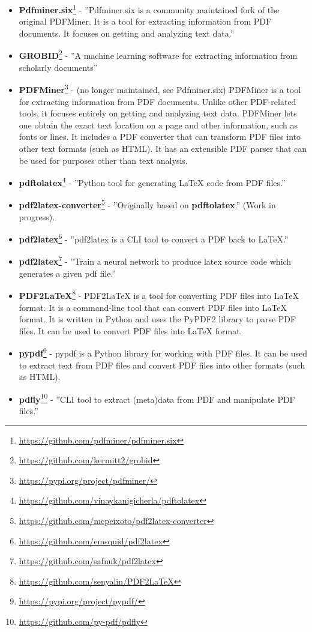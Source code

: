 \begin{itemize}
    \item \textbf{Pdfminer.six}\footnote{\url{https://github.com/pdfminer/pdfminer.six}} - ''Pdfminer.six is a community maintained fork of the original PDFMiner. It is a tool for extracting information from PDF documents. It focuses on getting and analyzing text data.''
    \item \textbf{GROBID}\footnote{\url{https://github.com/kermitt2/grobid}} - ''A machine learning software for extracting information from scholarly documents''
    \item \textbf{PDFMiner}\footnote{\url{https://pypi.org/project/pdfminer/}} - (no longer maintained, see Pdfminer.six) PDFMiner is a tool for extracting information from PDF documents. Unlike other PDF-related tools, it focuses entirely on getting and analyzing text data. PDFMiner lets one obtain the exact text location on a page and other information, such as fonts or lines. It includes a PDF converter that can transform PDF files into other text formats (such as HTML). It has an extensible PDF parser that can be used for purposes other than text analysis.
    \item \textbf{pdftolatex}\footnote{\url{https://github.com/vinaykanigicherla/pdftolatex}} - ''Python tool for generating \LaTeX{} code from PDF files.''
    \item \textbf{pdf2latex-converter}\footnote{\url{https://github.com/mcpeixoto/pdf2latex-converter}} - ''Originally based on \textbf{pdftolatex}.'' (Work in progress).
    \item \textbf{pdf2latex}\footnote{\url{https://github.com/emsquid/pdf2latex}} - ''pdf2latex is a CLI tool to convert a PDF back to LaTeX.''
    \item \textbf{pdf2latex}\footnote{\url{https://github.com/safnuk/pdf2latex}} - ''Train a neural network to produce latex source code which generates a given pdf file.''
    \item \textbf{PDF2LaTeX}\footnote{\url{https://github.com/senyalin/PDF2LaTeX}} - PDF2LaTeX is a tool for converting PDF files into \LaTeX{} format. It is a command-line tool that can convert PDF files into \LaTeX{} format. It is written in Python and uses the PyPDF2 library to parse PDF files. It can be used to convert PDF files into \LaTeX{} format.
    \item \textbf{pypdf}\footnote{\url{https://pypi.org/project/pypdf/}} - pypdf is a Python library for working with PDF files. It can be used to extract text from PDF files and convert PDF files into other formats (such as HTML).
    \item \textbf{pdfly}\footnote{\url{https://github.com/py-pdf/pdfly}} - ''CLI tool to extract (meta)data from PDF and manipulate PDF files.''
\end{itemize}


